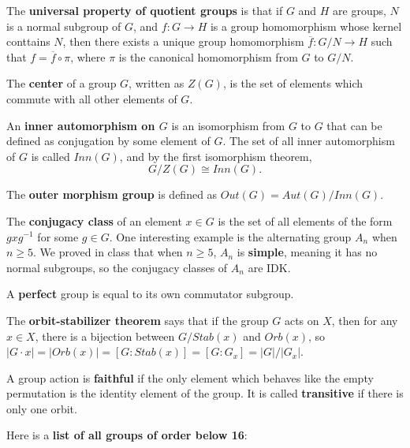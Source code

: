 \documentclass[12pt]{article}
\begin{document}
\bigskip
\par
The \textbf{universal property of quotient groups} is that if $G$ and $H$ are groups, $N$ is a normal subgroup of $G$, and $f: G \rightarrow H$ is a group homomorphism whose kernel conttains $N$, then there exists a unique group homomorphism $\overline{f}: G/N \rightarrow H$ such that $f = \overline{f} \circ \pi$, where $\pi$ is the canonical homomorphism from $G$ to $G/N$.
\bigskip
\par
The \textbf{center} of a group $G$, written as $Z(G)$, is the set of elements which commute with all other elements of $G$.
\bigskip
\par
An \textbf{inner automorphism on $G$} is an isomorphism from $G$ to $G$ that can be defined as conjugation by some element of $G$. The set of all inner automorphism of $G$ is called $Inn(G)$, and by the first isomorphism theorem,
\[ G/Z(G) \cong Inn(G). \]
\bigskip
\par
The \textbf{outer morphism group} is defined as $Out(G) = Aut(G)/Inn(G)$.
\bigskip
\par
The \textbf{conjugacy class} of an element $x \in G$ is the set of all elements of the form $gxg^{-1}$ for some $g \in G$. One interesting example is the alternating group $A_n$ when $n \geq 5$. We proved in class that when $n \geq 5$, $A_n$ is \textbf{simple}, meaning it has no normal subgroups, so the conjugacy classes of $A_n$ are IDK.
\bigskip
\par
A \textbf{perfect} group is equal to its own commutator subgroup.
\bigskip
\par
The \textbf{orbit-stabilizer theorem} says that if the group $G$ acts on $X$, then for any $x \in X$, there is a bijection between $G / Stab(x)$ and $Orb(x)$, so $|G \cdot x| = |Orb(x)| = [G : Stab(x)] = [G : G_x] = |G|/|G_x|$.
\bigskip
\par
A group action is \textbf{faithful} if the only element which behaves like the empty permutation is the identity element of the group. It is called \textbf{transitive} if there is only one orbit.
\bigskip
\par
Here is a \textbf{list of all groups of order below 16}:
\bigskip
\par
\end{document}
